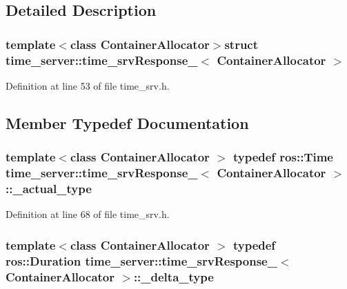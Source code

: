 \subsection{\-Detailed \-Description}
\subsubsection*{template$<$class Container\-Allocator$>$struct time\-\_\-server\-::time\-\_\-srv\-Response\-\_\-$<$ Container\-Allocator $>$}



\-Definition at line 53 of file time\-\_\-srv.\-h.



\subsection{\-Member \-Typedef \-Documentation}
\subsubsection[{\-\_\-actual\-\_\-type}]{\setlength{\rightskip}{0pt plus 5cm}template$<$class Container\-Allocator $>$ typedef ros\-::\-Time {\bf time\-\_\-server\-::time\-\_\-srv\-Response\-\_\-}$<$ \-Container\-Allocator $>$\-::{\bf \-\_\-actual\-\_\-type}}\label{structtime__server_1_1time__srvResponse___a577ecd0228ccf98a991ab53a8001e412}


\-Definition at line 68 of file time\-\_\-srv.\-h.

\subsubsection[{\-\_\-delta\-\_\-type}]{\setlength{\rightskip}{0pt plus 5cm}template$<$class Container\-Allocator $>$ typedef ros\-::\-Duration {\bf time\-\_\-server\-::time\-\_\-srv\-Response\-\_\-}$<$ \-Container\-Allocator $>$\-::{\bf \-\_\-delta\-\_\-type}}\label{structtime__server_1_1time__srvResponse___ac2760d5a5cad7fcb03022a9ab9da47db}


